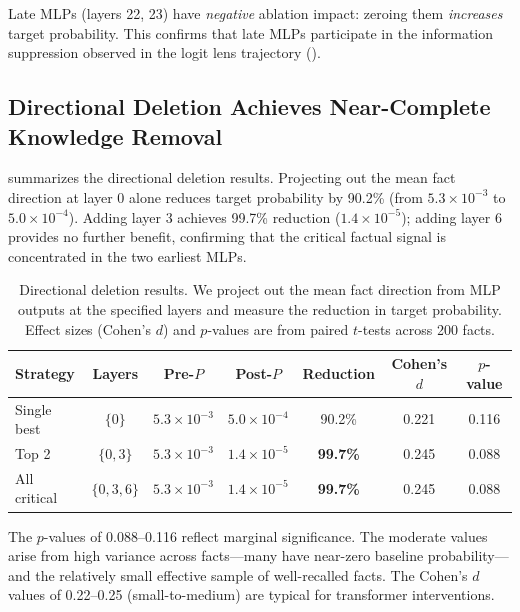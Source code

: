 Late MLPs (layers 22, 23) have \emph{negative} ablation impact: zeroing them \emph{increases} target probability. This confirms that late MLPs participate in the information suppression observed in the logit lens trajectory ().

\subsection{Directional Deletion Achieves Near-Complete Knowledge Removal}
\label{sec:results_deletion}

 summarizes the directional deletion results. Projecting out the mean fact direction at layer 0 alone reduces target probability by 90.2\% (from $5.3 \times 10^{-3}$ to $5.0 \times 10^{-4}$). Adding layer 3 achieves 99.7\% reduction ($1.4 \times 10^{-5}$); adding layer 6 provides no further benefit, confirming that the critical factual signal is concentrated in the two earliest MLPs.

\begin{table}[t]
    \centering
    \caption{Directional deletion results. We project out the mean fact direction from MLP outputs at the specified layers and measure the reduction in target probability. Effect sizes (Cohen's $d$) and $p$-values are from paired $t$-tests across 200 facts.}
    \label{tab:deletion}
    \begin{tabular}{@{}lcccccc@{}}
        \toprule
        \textbf{Strategy} & \textbf{Layers} & \textbf{Pre-$P$} & \textbf{Post-$P$} & \textbf{Reduction} & \textbf{Cohen's $d$} & \textbf{$p$-value} \\
        \midrule
        Single best & $\{0\}$ & $5.3 \times 10^{-3}$ & $5.0 \times 10^{-4}$ & 90.2\% & 0.221 & 0.116 \\
        Top 2 & $\{0, 3\}$ & $5.3 \times 10^{-3}$ & $1.4 \times 10^{-5}$ & {\bf 99.7\%} & 0.245 & 0.088 \\
        All critical & $\{0, 3, 6\}$ & $5.3 \times 10^{-3}$ & $1.4 \times 10^{-5}$ & {\bf 99.7\%} & 0.245 & 0.088 \\
        \bottomrule
    \end{tabular}
\end{table}

 The $p$-values of 0.088--0.116 reflect marginal significance. The moderate values arise from high variance across facts---many have near-zero baseline probability---and the relatively small effective sample of well-recalled facts. The Cohen's $d$ values of 0.22--0.25 (small-to-medium) are typical for transformer interventions.

